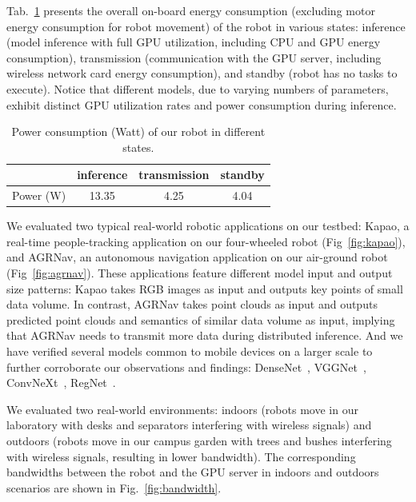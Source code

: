 Tab.~\ref{tab:energydefault} presents the overall on-board energy consumption (excluding motor energy consumption for robot movement) of the robot in various states: inference (model inference with full GPU utilization, including CPU and GPU energy consumption), transmission (communication with the GPU server, including wireless network card energy consumption), and standby (robot has no tasks to execute).
Notice that different models, due to varying numbers of parameters, exhibit distinct GPU utilization rates and power consumption during inference. 

\begin{table}[!t]
    \centering
    \begin{tabular}{|c|c|c|c|}
    \hline
            & inference & transmission & standby \\ \hline
    Power (W) &     13.35        &       4.25        &    4.04   \\ \hline
    \end{tabular}
    \caption{Power consumption (Watt) of our robot in different states.}
    \label{tab:energydefault}
    \end{table}

We evaluated two typical real-world robotic applications on our testbed: Kapao, a real-time people-tracking application on our four-wheeled robot (Fig~\ref{fig:kapao}), and AGRNav, an autonomous navigation application on our air-ground robot (Fig~\ref{fig:agrnav}). 
These applications feature different model input and output size patterns: Kapao takes RGB images as input and outputs key points of small data volume. In contrast, AGRNav takes point clouds as input and outputs predicted point clouds and semantics of similar data volume as input, implying that AGRNav needs to transmit more data during distributed inference. 
And we have verified several models common to mobile devices on a larger scale to further corroborate our observations and findings: DenseNet~\cite{huang2018densely}, VGGNet~\cite{simonyan2015deep}, ConvNeXt~\cite{woo2023convnext}, RegNet~\cite{xu2022regnet}.

We evaluated two real-world environments: indoors (robots move in our laboratory with desks and separators interfering with wireless signals) and outdoors (robots move in our campus garden with trees and bushes interfering with wireless signals, resulting in lower bandwidth). 
The corresponding bandwidths between the robot and the GPU server in indoors and outdoors scenarios are shown in Fig.~\ref{fig:bandwidth}.

